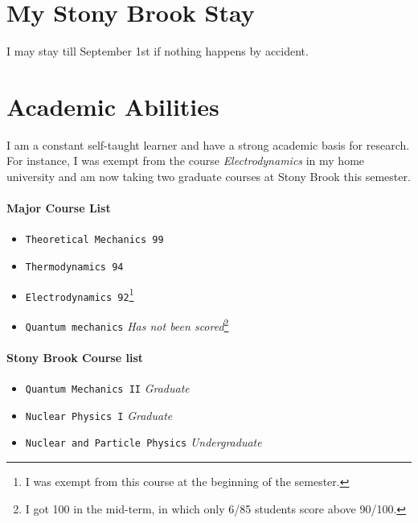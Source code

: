 \documentclass[margin]{res}
\begin{document}

\address{{\bf E-mail and Phone number} \\yerong.li@stonybrook.edu\\ li.yerong@smail.nju.edu.cn \\
        \mbox{(631) 432-2160}}
\address{{\bf Present Address} \\ Room 303C,West Apartment\\ Stony Brook University \\
        Stony Brook, NY 11794 }


\begin{resume}

\section{My Stony Brook Stay}
I may stay till September 1st if nothing happens by accident.



\section{Academic Abilities}
I am a constant self-taught learner and have a strong academic basis for research. For instance, I was exempt from the course \emph{Electrodynamics} in my home university and am now taking two graduate courses at Stony Brook this semester.
\paragraph{Major Course List}
 \begin{itemize} \itemsep -2pt
                 \item  \verb|Theoretical Mechanics 99|
                 \item  \verb|Thermodynamics 94|
                 \item  \verb|Electrodynamics 92|\footnote{I was exempt from this course at the beginning of the semester.}
                 \item  \verb|Quantum mechanics| \emph{Has not been scored}\footnote{I got 100 in the mid-term, in which only 6/85 students score above 90/100.}
 \end{itemize}

\paragraph{Stony Brook Course list}
   \begin{itemize} \itemsep -2pt
                 \item  \verb|Quantum Mechanics II| \emph{Graduate}
                 \item  \verb|Nuclear Physics I| \emph{Graduate}
                 \item  \verb|Nuclear and Particle Physics| \emph{Undergraduate}
   \end{itemize}

\end{resume}
\end{document}
